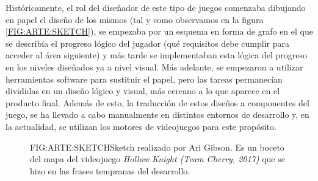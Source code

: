 Históricamente, el rol del diseñador de este tipo de juegos comenzaba dibujando en papel el diseño de los mismos (tal y como observamos en la figura \ref{FIG:ARTE:SKETCH}), se empezaba por un esquema en forma de grafo en el que se describía el progreso lógico del jugador (qué requisitos debe cumplir para acceder al área siguiente) y más tarde se implementaban esta lógica del progreso en los niveles diseñados ya a nivel visual.
Más adelante, se empezaron a utilizar herramientas software para sustituir el papel, pero las tareas permanecían divididas en un diseño lógico y visual, más cercano a lo que aparece en el producto final.
Además de esto, la traducción de estos diseños a componentes del juego, se ha llevado a cabo manualmente en distintos entornos de desarrollo y, en la actualidad, se utilizan los motores de videojuegos para este propósito.

\begin{figure}{FIG:ARTE:SKETCH}{Sketch realizado por Ari Gibson. Es un boceto del mapa del videojuego  \textit{Hollow Knight\cite{hollowknight} (Team Cherry, 2017)} que se hizo en las frases tempranas del desarrollo.}
\end{figure}